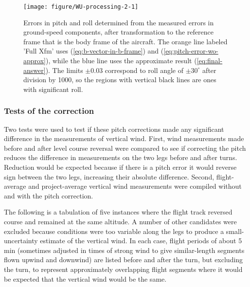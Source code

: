 \documentclass[12pt,twoside,english]{article}\usepackage[]{graphicx}\usepackage[]{color}
\newenvironment{knitrout}{}{} %
\let\OrgIndex\index
\renewcommand*{\index}[1]{\OrgIndex{#1}}
\begin{document}
\begin{knitrout}\footnotesize
{}\color{fgcolor}\begin{figure}

{\centering \texttt{[image: figure/WU-processing-2-1]} 

}

\caption[Errors in pitch and roll determined from the measured errors in ground-speed components, after transformation to the reference frame that is the body frame of the aircraft.]{Errors in pitch and roll determined from the measured errors in ground-speed components, after transformation to the reference frame that is the body frame of the aircraft. The orange line labeled 'Full Xfm' uses (\ref{eq:b-vector-in-b-frame}) and (\ref{eq:pitch-error-wo-approx}), while the blue line uses the approximate result (\ref{eq:final-answer}). The limits $\pm$0.03 correspond to roll angle of $\pm 30^{\circ}$ after division by 1000, so the regions with vertical black lines are ones with significant roll.}\label{fig:processing-2}
\end{figure}


\end{knitrout}

\subsubsection{Tests of the correction}

Two tests were used to test if these pitch corrections made any significant difference in the measurements of vertical wind. First, wind measurements made before and after level course reversal were compared to see if correcting the pitch reduces the difference in measurements on the two legs before and after turns. Reduction would be expected because if there is a pitch error it would reverse sign between the two legs, increasing their absolute difference. Second, flight-average and project-average vertical wind measurements were compiled without and with the pitch correction. 

The following is a tabulation of five instances where the flight track reversed course and remained at the same altitude. A number of other candidates were excluded because conditions were too variable along the legs to produce a small-uncertainty estimate of the vertical wind. In each case, flight periods of about 5 min (sometimes adjusted in times of strong wind to give similar-length segments flown upwind and downwind) are listed before and after the turn, but excluding the turn, to represent approximately overlapping flight segments where it would be expected that the vertical wind would be the same. 
\end{document}
